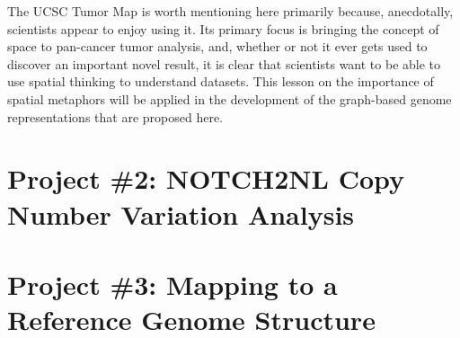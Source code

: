 \documentclass[11pt,proposal]{ucthesis}
\begin{document}
The UCSC Tumor Map is worth mentioning here primarily because, anecdotally, scientists appear to enjoy using it. Its primary focus is bringing the concept of space to pan-cancer tumor analysis, and, whether or not it ever gets used to discover an important novel result, it is clear that scientists want to be able to use spatial thinking to understand datasets. This lesson on the importance of spatial metaphors will be applied in the development of the graph-based genome representations that are proposed here.

    
    
    

    

\section{Project \#2: NOTCH2NL Copy Number Variation Analysis}

    
    
        
    


\section{Project \#3: Mapping to a Reference Genome Structure}
\end{document}
